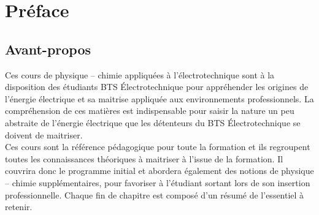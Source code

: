 

\begin{comment}

\documentclass[a4paper, 11pt, twoside]{memoir}





	\openleft %

\end{comment}

\chapter{Préface}

\section{Avant-propos}

Ces cours de physique -- chimie appliquées à l'électrotechnique sont à la disposition des étudiants BTS \'Electrotechnique pour appréhender les origines de l'énergie électrique et sa maitrise appliquée aux environnements professionnels. La compréhension de ces matières est indispensable pour saisir la nature un peu abstraite de l'énergie électrique que les détenteurs du BTS \'Electrotechnique se doivent de maitriser.\\
Ces cours sont la référence pédagogique pour toute la formation et ils regroupent toutes les connaissances théoriques à maitriser à l'issue de la formation. Il couvrira donc le programme initial et abordera également des notions de physique -- chimie supplémentaires, pour favoriser à l'étudiant sortant lors de son insertion professionnelle. Chaque fin de chapitre est composé d'un résumé de l'essentiel à retenir.\\

